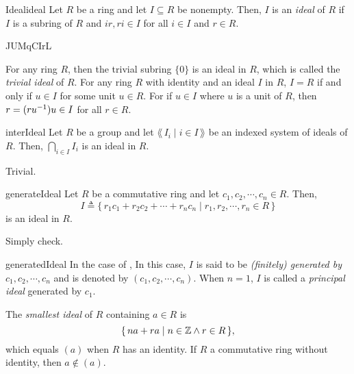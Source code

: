 \documentclass[../modern_algebra.tex]{subfiles}
\begin{document}
\begin{Definition}[colbacktitle=red!75!black]{Ideal}{ideal}
    Let \(R\) be a ring and let \(I \subseteq R\) be nonempty.
    Then, \(I\) is an \textit{ideal} of \(R\)
    if \(I\) is a subring of \(R\) and \(ir, ri \in I\) for all \(i \in I\) and \(r \in R\).
\end{Definition}

\begin{Example}{}{JUMqCIrL}
    \begin{enumerate}[nolistsep, label=(\roman*), ref=\protect{\Cref{exmp:JUMqCIrL} (\roman*)}]
    \ii
    For any ring \(R\), then the trivial subring \(\{0\}\)
    is an ideal in \(R\), which is called the \textit{trivial ideal} of \(R\).
    \ii\label{itm:idealUnit}
    For any ring \(R\) with identity and an ideal \(I\) in \(R\),
    \(I = R\) if and only if \(u \in I\) for some unit \(u \in R\).
    For if \(u \in I\) where \(u\) is a unit of \(R\), then \(r = (ru^{-1})u \in I\)
    for all \(r \in R\).
\end{enumerate}
\end{Example}

\begin{Corollary}{}{interIdeal}
    Let \(R\) be a group and let \(\lang\,I_i \mid i \in I\,\rang\)
    be an indexed system of ideals of \(R\).
    Then, \(\bigcap_{i \in I} I_i\) is an ideal in \(R\).
\end{Corollary}
\begin{myproof}[Proof]
    Trivial.
\end{myproof}

\begin{Theorem}{\textsf{}}{generateIdeal}
    Let \(R\) be a commutative ring and let \(c_1, c_2, \cdots, c_n \in R\). Then,
    \[
        I \triangleq \{\,r_1c_1 + r_2c_2 + \cdots + r_nc_n \mid r_1, r_2, \cdots, r_n \in R\,\}
    \]
    is an ideal in \(R\).
\end{Theorem}
\begin{myproof}[Proof]
    Simply check.
\end{myproof}

\begin{Definition}[colbacktitle=red!75!black]{}{generatedIdeal}
    In the case of ,
    In this case, \(I\) is said to be \textit{(finitely) generated by} \(c_1, c_2, \cdots, c_n\)
    and is denoted by \((c_1, c_2, \cdots, c_n)\).
    When \(n = 1\), \(I\) is called a \textit{principal ideal} generated by \(c_1\).
\end{Definition}

\begin{note}
    The \textit{smallest ideal} of \(R\) containing \(a \in R\) is
    \[
        \{\,na + ra \mid n \in \ZZ \land r \in R\,\},
    \]
    which equals \((a)\) when \(R\) has an identity.
    If \(R\) a commutative ring without identity,
    then \(a \notin (a)\).
\end{note}
\end{document}
